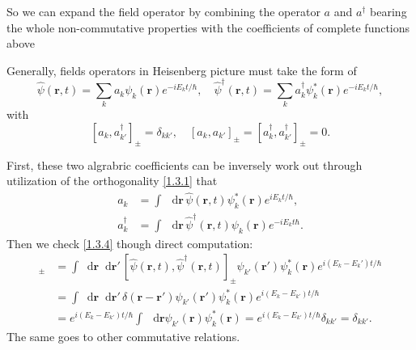 \documentclass[b5paper,10pt,UTF8]{book}
\newcommand*\dd{\mathop{}\!\mathrm{d}}
\numberwithin{equation}{section}
\begin{document}
		So we can expand the field operator by combining the operator $a$ and $a^\dagger$ bearing the whole non-commutative properties with the coefficients of complete functions above
		\begin{Assertion}
			Generally, fields operators in Heisenberg picture must take the form of 
			\begin{equation}\label{1.3.3}
				\hat{\psi}(\bm{r},t)=\sum_ka_k\psi_k(\bm{r})e^{-iE_kt/\hbar},\quad\hat{\psi}^\dagger(\bm{r},t)=\sum_ka^\dagger_k\psi^*_k(\bm{r})e^{-iE_kt/\hbar},
			\end{equation}
			with 
			\begin{equation}\label{1.3.4}
				[a_k,a_{k'}^\dagger]_{\pm}=\delta_{kk'},\quad[a_k,a_{k'}]_{\pm}=[a^\dagger_k,a^\dagger_{k'}]_{\pm}=0.
			\end{equation}
		\end{Assertion}
		\begin{Proof}
			First, these two algrabric coefficients can be inversely work out through utilization of the orthogonality \eqref{1.3.1} that  
			\begin{align*}
				a_k&=\int\,\dd\bm{r}\,\hat{\psi}(\bm{r},t)\psi_k^*(\bm{r})e^{iE_k t/\hbar},\\
				a_k^{\dagger}&=\int\,\dd\bm{r}\,\hat{\psi}^\dagger(\bm{r},t)\psi_k(\bm{r})e^{-iE_k t\hbar}.
			\end{align*}
			Then we check \eqref{1.3.4} though direct computation: 
			\begin{align*}
				[a_k,a^\dagger_{k'}]_{\pm}&=\int\dd\bm{r}\dd\bm{r'}\,[\hat{\psi}(\bm{r},t),\hat{\psi}^\dagger(\bm{r},t)]_{\pm}\psi_{k'}(\bm{r'})\psi^*_{k}(\bm{r})e^{i(E_k-E_k')t/\hbar}\\
				&=\int\dd\bm{r}\dd\bm{r'}\,\delta(\bm{r}-\bm{r'})\psi_{k'}(\bm{r'})\psi^*_{k}(\bm{r})e^{i(E_k-E_{k'})t/\hbar}\\
				&=e^{i(E_k-E_{k'})t/\hbar}\int\,\dd\bm{r}\psi_{k'}(\bm{r})\psi_k^*(\bm{r})=e^{i(E_k-E_{k'})t/\hbar}\delta_{kk'}=\delta_{kk'}.
			\end{align*}
			The same goes to other commutative relations.
		\end{Proof}
\end{document}
